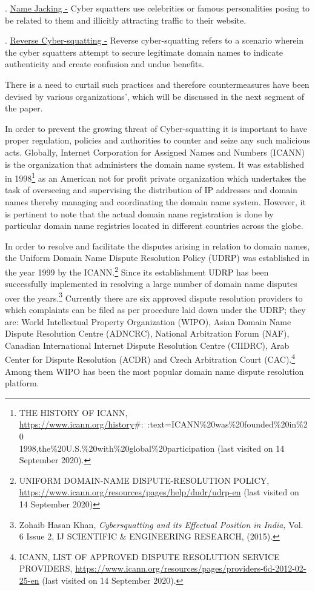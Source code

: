\begin{multicols}{2}
. \underline{Name Jacking -} Cyber squatters use celebrities or famous personalities posing to be related
to them and illicitly attracting traffic to their website.

. \underline{Reverse Cyber-squatting -} Reverse cyber-squatting refers to a scenario wherein the cyber
squatters attempt to secure legitimate domain names to indicate authenticity and create
confusion and undue benefits.

\noi
There is a need to curtail such practices and therefore countermeasures have been devised by
various organizations’, which will be discussed in the next segment of the paper.


\noi
In order to prevent the growing threat of Cyber-squatting it is important to have proper
regulation, policies and authorities to counter and seize any such malicious acts. Globally,
Internet Corporation for Assigned Names and Numbers (ICANN) is the organization that
administers the domain name system. It was established in 1998\footnote{THE HISTORY OF ICANN, \url{https://www.icann.org/history}\#:~:text=ICANN\%20was\%20founded\%20in\%20\\1998,the\%20U.S.\%20with\%20global\%20participation (last visited on 14 September 2020).} as an American not for profit private organization which undertakes the task of overseeing and supervising the
distribution of IP addresses and domain names thereby managing and coordinating the
domain name system. However, it is pertinent to note that the actual domain name
registration is done by particular domain name registries located in different countries across
the globe.

\noi
In order to resolve and facilitate the disputes arising in relation to domain names, the Uniform
Domain Name Dispute Resolution Policy (UDRP) was established in the year 1999 by the
ICANN.\footnote{UNIFORM DOMAIN-NAME DISPUTE-RESOLUTION POLICY,
\url{https://www.icann.org/resources/pages/help/dndr/udrp-en} (last visited on 14 September 2020)} Since its establishment UDRP has been successfully implemented in resolving a
large number of domain name disputes over the years.\footnote{Zohaib Hasan Khan, \textit{Cybersquatting and its Effectual Position in India,} Vol. 6 Issue 2, IJ SCIENTIFIC \& ENGINEERING RESEARCH, (2015).} Currently there are six approved
dispute resolution providers to which complaints can be filed as per procedure laid down
under the UDRP; they are: World Intellectual Property Organization (WIPO), Asian Domain
Name Dispute Resolution Centre (ADNCRC), National Arbitration Forum (NAF), Canadian
International Internet Dispute Resolution Centre (CIIDRC), Arab Center for Dispute
Resolution (ACDR) and Czech Arbitration Court (CAC).\footnote{ICANN, LIST OF APPROVED DISPUTE RESOLUTION SERVICE PROVIDERS, \url{https://www.icann.org/resources/pages/providers-6d-2012-02-25-en} (last visited on 14 September 2020).} Among them WIPO has been the most popular domain name dispute resolution platform.


\end{multicols}
